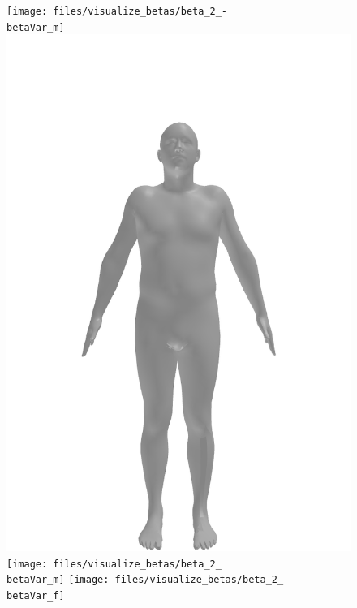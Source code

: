 \begin{figure}[ht!]
    \centering

    \begin{minipage}[b]{\textwidth}
        \centering
        \texttt{[image: files/visualize\_betas/beta\_2\_-\\betaVar\_m]}
        \includegraphics[width=\imgWidth]{files/visualize_betas/baseline_m}
        \texttt{[image: files/visualize\_betas/beta\_2\_\\betaVar\_m]}
        \linebreak
        \texttt{[image: files/visualize\_betas/beta\_2\_-\\betaVar\_f]}

\end{minipage}
\end{figure}
